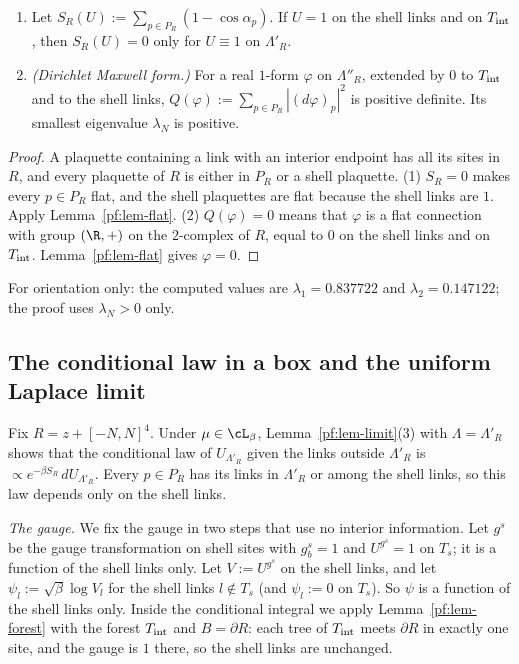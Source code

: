\begin{corollary}\label{pf:cor-zero}
\leavevmode
\begin{enumerate}
\item Let $S_R(U):=\sum_{p\in P_R}(1-\cos\alpha_p)$. If $U=1$ on the shell links and on $T_{\rm int}$, then $S_R(U)=0$ only for $U\equiv1$ on $\Lambda'_R$.
\item \emph{(Dirichlet Maxwell form.)} For a real $1$-form $\varphi$ on $\Lambda''_R$, extended by $0$ to $T_{\rm int}$ and to the shell links, $Q(\varphi):=\sum_{p\in P_R}|(d\varphi)_p|^2$ is positive definite. Its smallest eigenvalue $\lambda_N$ is positive.
\end{enumerate}
\end{corollary}

\begin{proof}
A plaquette containing a link with an interior endpoint has all its sites in $R$, and every plaquette of $R$ is either in $P_R$ or a shell plaquette. (1) $S_R=0$ makes every $p\in P_R$ flat, and the shell plaquettes are flat because the shell links are $1$. Apply Lemma~\ref{pf:lem-flat}. (2) $Q(\varphi)=0$ means that $\varphi$ is a flat connection with group $(\R,+)$ on the $2$-complex of $R$, equal to $0$ on the shell links and on $T_{\rm int}$. Lemma~\ref{pf:lem-flat} gives $\varphi=0$.
\end{proof}

For orientation only: the computed values are $\lambda_1=0.837722$ and $\lambda_2=0.147122$; the proof uses $\lambda_N>0$ only.

\subsection{The conditional law in a box and the uniform Laplace limit}\label{pf:sec-L3}

Fix $R=z+[-N,N]^4$. Under $\mu\in\cL_\beta$, Lemma~\ref{pf:lem-limit}(3) with $\Lambda=\Lambda'_R$ shows that the conditional law of $U_{\Lambda'_R}$ given the links outside $\Lambda'_R$ is $\propto e^{-\beta S_R}\,dU_{\Lambda'_R}$. Every $p\in P_R$ has its links in $\Lambda'_R$ or among the shell links, so this law depends only on the shell links.

\emph{The gauge.} We fix the gauge in two steps that use no interior information. Let $g^s$ be the gauge transformation on shell sites with $g^s_b=1$ and $U^{g^s}=1$ on $T_s$; it is a function of the shell links only. Let $V:=U^{g^s}$ on the shell links, and let $\psi_l:=\sqrt\beta\log V_l$ for the shell links $l\notin T_s$ (and $\psi_l:=0$ on $T_s$). So $\psi$ is a function of the shell links only. Inside the conditional integral we apply Lemma~\ref{pf:lem-forest} with the forest $T_{\rm int}$ and $B=\partial R$: each tree of $T_{\rm int}$ meets $\partial R$ in exactly one site, and the gauge is $1$ there, so the shell links are unchanged.

